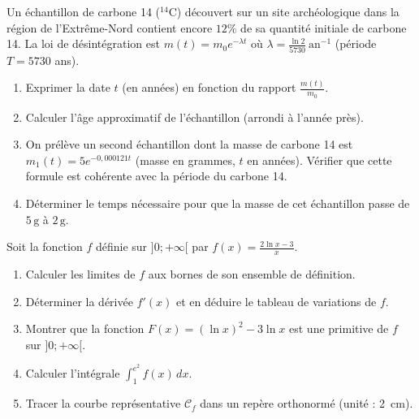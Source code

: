 \documentclass[11pt]{article}
\begin{document}
\begin{exercice}
Un échantillon de carbone 14 ($^{14}\mathrm{C}$) découvert sur un site archéologique dans la région de l'Extrême-Nord contient encore $12\%$ de sa quantité initiale de carbone 14. La loi de désintégration est $m(t) = m_0 e^{-\lambda t}$ où $\lambda = \frac{\ln 2}{5730}\ \text{an}^{-1}$ (période $T = 5730$ ans).
\begin{enumerate}
    \item Exprimer la date $t$ (en années) en fonction du rapport $\frac{m(t)}{m_0}$.
    \item Calculer l'âge approximatif de l'échantillon (arrondi à l'année près).
    \item On prélève un second échantillon dont la masse de carbone 14 est $m_1(t) = 5 e^{-0{,}000121 t}$ (masse en grammes, $t$ en années). Vérifier que cette formule est cohérente avec la période du carbone 14.
    \item Déterminer le temps nécessaire pour que la masse de cet échantillon passe de $5\,\text{g}$ à $2\,\text{g}$.
\end{enumerate}
\end{exercice}

\begin{exercice}
Soit la fonction $f$ définie sur $]0 ; +\infty[$ par $f(x) = \frac{2\ln x - 3}{x}$.
\begin{enumerate}
    \item Calculer les limites de $f$ aux bornes de son ensemble de définition.
    \item Déterminer la dérivée $f'(x)$ et en déduire le tableau de variations de $f$.
    \item Montrer que la fonction $F(x) = (\ln x)^2 - 3\ln x$ est une primitive de $f$ sur $]0 ; +\infty[$.
    \item Calculer l'intégrale $\displaystyle \int_{1}^{e^2} f(x)\, dx$.
    \item Tracer la courbe représentative $\mathcal{C}_f$ dans un repère orthonormé (unité : \SI{2}{cm}).
\end{enumerate}
\end{exercice}
\end{document}

